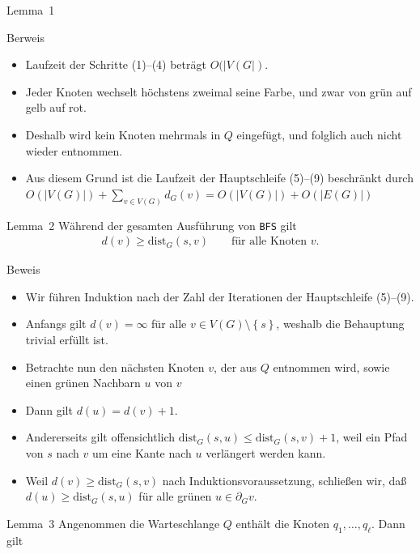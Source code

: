 \documentclass[aspectratio=1610, 11pt]{beamer}
\newcommand\dist{\mathrm{dist}}
\newcommand\cbc[1]{\left\{{#1}\right\}}
\begin{document}
\begin{frame}
\begin{overprint}
\begin{block}{Lemma~1}
		\end{block}
		\begin{exampleblock}{Berweis}
			\begin{itemize}
				\item Laufzeit der Schritte (1)--(4) betr\"agt $O(|V(G|)$.
				\item Jeder Knoten wechselt h\"ochstens zweimal seine Farbe, und zwar von gr\"un auf gelb auf rot.
				\item Deshalb wird kein Knoten mehrmals in $Q$ eingef\"ugt, und folglich auch nicht wieder entnommen.
				\item Aus diesem Grund ist die Laufzeit der Hauptschleife (5)--(9) beschr\"ankt durch $O(|V(G)|)+\sum_{v\in V(G)}d_G(v)=O(|V(G)|)+O(|E(G)|)$
			\end{itemize}
		\end{exampleblock}
		\begin{block}{Lemma~2}
			W\"ahrend der gesamten Ausf\"uhrung von {\tt BFS} gilt 
			\begin{align*}
				d(v)\geq\dist_G(s,v)\qquad\mbox{f\"ur alle Knoten $v$}.
			\end{align*}
		\end{block}
		\begin{exampleblock}{Beweis}
			\begin{itemize}
				\item Wir f\"uhren Induktion nach der Zahl der Iterationen der Hauptschleife (5)--(9).
				\item Anfangs gilt $d(v)=\infty$ f\"ur alle $v\in V(G)\setminus\cbc s$, weshalb die Behauptung trivial erf\"ullt ist.
				\item Betrachte nun den n\"achsten Knoten $v$, der aus $Q$ entnommen wird, sowie einen gr\"unen Nachbarn $u$ von $v$
				\item	Dann gilt $d(u)=d(v)+1$.
				\item Andererseits gilt offensichtlich $\dist_G(s,u)\leq\dist_G(s,v)+1$, weil ein Pfad von $s$ nach $v$ um eine Kante nach $u$ verl\"angert werden kann.
				\item Weil $d(v)\geq\dist_G(s,v)$ nach Induktionsvoraussetzung, schlie\ss en wir, da\ss\ $d(u)\geq\dist_G(s,u)$ f\"ur alle gr\"unen $u\in\partial_Gv$.
			\end{itemize}
		\end{exampleblock}
		\begin{block}{Lemma~3}
			Angenommen die Warteschlange $Q$ enth\"alt die Knoten $q_1,\ldots,q_\ell$.
			Dann gilt 

\end{block}
\end{overprint}
\end{frame}
\end{document}
